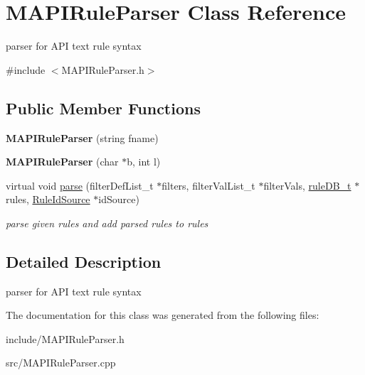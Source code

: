 \hypertarget{classMAPIRuleParser}{}\section{M\+A\+P\+I\+Rule\+Parser Class Reference}
\label{classMAPIRuleParser}


parser for A\+PI text rule syntax  




{\ttfamily \#include $<$M\+A\+P\+I\+Rule\+Parser.\+h$>$}

\subsection*{Public Member Functions}
\begin{DoxyCompactItemize}
\item 
\mbox{\label{classMAPIRuleParser_a07739a5e373e83dcd185395a6ed314b2}} 
{\bfseries M\+A\+P\+I\+Rule\+Parser} (string fname)
\item 
\mbox{\label{classMAPIRuleParser_aa57dd2fec819cc49f4456c4e1583f0ba}} 
{\bfseries M\+A\+P\+I\+Rule\+Parser} (char $\ast$b, int l)
\item 
\mbox{\label{classMAPIRuleParser_a9dd9992ed6cbebddf20e0ddbb6c16339}} 
virtual void \hyperlink{classMAPIRuleParser_a9dd9992ed6cbebddf20e0ddbb6c16339}{parse} (filter\+Def\+List\+\_\+t $\ast$filters, filter\+Val\+List\+\_\+t $\ast$filter\+Vals, \hyperlink{RuleFileParser_8h_a7d5bb94bb17a8a1d92db2a89a0cc96d1}{rule\+D\+B\+\_\+t} $\ast$rules, \hyperlink{classRuleIdSource}{Rule\+Id\+Source} $\ast$id\+Source)
\begin{DoxyCompactList}\small\item\em parse given rules and add parsed rules to rules \end{DoxyCompactList}\end{DoxyCompactItemize}


\subsection{Detailed Description}
parser for A\+PI text rule syntax 

The documentation for this class was generated from the following files\+:\begin{DoxyCompactItemize}
\item 
include/M\+A\+P\+I\+Rule\+Parser.\+h\item 
src/M\+A\+P\+I\+Rule\+Parser.\+cpp\end{DoxyCompactItemize}
